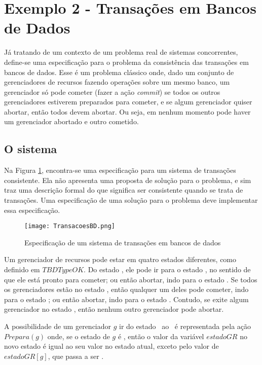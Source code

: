 \section{Exemplo 2 - Transações em Bancos de Dados}
\label{exemplo2}

Já tratando de um contexto de um problema real de sistemas concorrentes, define-se uma especificação para o problema da consistência das transações em bancos de dados. Esse é um problema clássico onde, dado um conjunto de gerenciadores de recursos fazendo operações sobre um mesmo banco, um gerenciador só pode cometer (fazer a ação \textit{commit}) se todos os outros gerenciadores estiverem preparados para cometer, e se algum gerenciador quiser abortar, então todos devem abortar. Ou seja, em nenhum momento pode haver um gerenciador abortado e outro cometido.

\subsection{O sistema}

Na Figura \ref{fig:ex2tla}, encontra-se uma especificação para um sistema de transações consistente. Ela não apresenta uma proposta de solução para o problema, e sim traz uma descrição formal do que significa ser consistente quando se trata de transações. Uma especificação de uma solução para o problema deve implementar essa especificação.

\begin{figure}[h]
  \centering
  \texttt{[image: TransacoesBD.png]}
  \caption{Especificação de um sistema de transações em bancos de dados}
\label{fig:ex2tla}
\end{figure}

Um gerenciador de recursos pode estar em quatro estados diferentes, como definido em $TBDTypeOK$. Do estado \trabalhando, ele pode ir para o estado \preparado, no sentido de que ele está pronto para cometer; ou então abortar, indo para o estado \abortado. Se todos os gerenciadores estão no estado \preparado, então qualquer um deles pode cometer, indo para o estado \cometido; ou então abortar, indo para o estado \abortado. Contudo, se exite algum gerenciador no estado \cometido, então nenhum outro gerenciador pode abortar.

A possibilidade de um gerenciador $g$ ir do estado \trabalhando\ ao \preparado\ é representada pela ação $Prepara(g)$ onde, se o estado de $g$ é \trabalhando, então o valor da variável $estadoGR$ no novo estado é igual ao seu valor no estado atual, exceto pelo valor de $estadoGR[g]$, que passa a ser \preparado.

